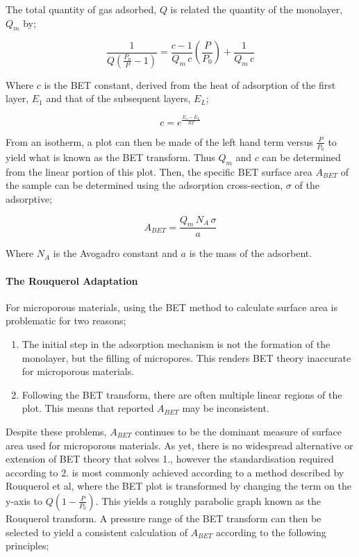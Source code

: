 The total quantity of gas adsorbed, $Q$ is related the quantity of the monolayer, $Q_m$ by; 

\begin{equation}
    \frac{1}{Q  \left( \frac{P_0}{P} - 1 \right)} = \frac{c-1}{Q_m \, c}  \left( \frac{P}{P_0} \right) + \frac{1}{Q_m \, c}
\end{equation}

Where $c$ is the BET constant, derived from the heat of adsorption of the first layer, $E_1$ and that of the subsequent layers, $E_L$;

\begin{equation}
    c = e^{\frac{E_1 - E_L}{RT}}
\end{equation}

From an isotherm, a plot can then be made of the left hand term versus $\frac{P}{P_0}$ to yield what is known as the BET transform. Thus $Q_m$ and $c$ can be determined from the linear portion of this plot. Then, the specific BET surface area $A_{BET}$ of the sample can be determined using the adsorption cross-section, $\sigma$ of the adsorptive;

\begin{equation}
    A_{BET} = \frac{Q_m \, N_A \, \sigma}{a}
\end{equation}


Where $N_A$ is the Avogadro constant and $a$ is the mass of the adsorbent.\citep{Brunauer1938Adsorption}

\paragraph{The Rouquerol Adaptation}

For microporous materials, using the BET method to calculate surface area is problematic for two reasons;

	\begin{enumerate}
		\item The initial step in the adsorption mechanism is not the formation of the monolayer, but the filling of micropores. This renders BET theory inaccurate for microporous materials.
		\item 	Following the BET transform, there are often multiple linear regions of the plot. This means that reported $A_{BET}$ may be inconsistent.
	\end{enumerate}

Despite these problems, $A_{BET}$ continues to be the dominant measure of surface area used for microporous materials. As yet, there is no widespread alternative or extension of BET theory that solves 1., however the standardisation required according to 2. is most commonly achieved according to a method described by Rouquerol et al, where the BET plot is transformed by changing the term on the y-axis to $Q \left(1 - \frac{P}{P_0} \right)$. This yields a roughly parabolic graph known as the Rouquerol transform. A pressure range of the BET transform can then be selected to yield a consistent calculation of $A_{BET}$ according to the following principles;

